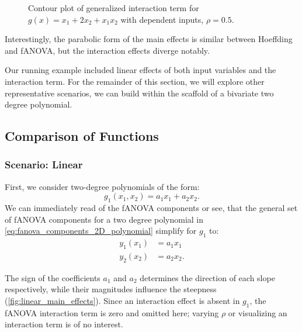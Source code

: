 \begin{figure}[htpb]
\begin{minipage}[t]{0.49\textwidth}
        \caption{Contour plot of generalized interaction term for $g(x) = x_1 + 2 x_2 + x_1 x_2$ with dependent inputs, $\rho = 0.5$.}
        \label{fig:dep_150_interact}
    \end{minipage}
\end{figure}
Interestingly, the parabolic form of the main effects is similar between Hoeffding and fANOVA, but the interaction effects diverge notably.\par
Our running example included linear effects of both input variables and the interaction term. For the remainder of this section, we will explore other representative scenarios, we can build within the scaffold of a bivariate two degree polynomial.

\subsection{Comparison of Functions}
\subsubsection*{Scenario: Linear}
First, we consider two-degree polynomials of the form:
$$g_1(x_1, x_2) = a_1 x_1 + a_2 x_2.$$
We can immediately read of the fANOVA components or see, that the general set of fANOVA components for a two degree polynomial in \autoref{eq:fanova_components_2D_polynomial} simplify for $g_1$ to:
\begin{align*}
    y_1(x_1) &= a_1 x_1 \\
    y_2(x_2) &= a_2 x_2.
\end{align*}

The sign of the coefficients $a_1$ and $a_2$ determines the direction of each slope respectively, while their magnitudes influence the steepness (\autoref{fig:linear_main_effects}). 
Since an interaction effect is absent in $g_1$, the fANOVA interaction term is zero and omitted here; varying $\rho$ or visualizing an interaction term is of no interest.

